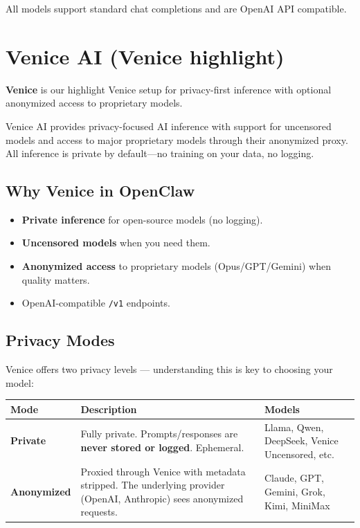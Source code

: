 All models support standard chat completions and are OpenAI API compatible.


\clearpage

\section{Venice AI (Venice highlight)}


\textbf{Venice} is our highlight Venice setup for privacy-first inference with optional anonymized access to proprietary models.

Venice AI provides privacy-focused AI inference with support for uncensored models and access to major proprietary models through their anonymized proxy. All inference is private by default—no training on your data, no logging.

\subsection{Why Venice in OpenClaw}


\begin{itemize}
  \item \textbf{Private inference} for open-source models (no logging).
  \item \textbf{Uncensored models} when you need them.
  \item \textbf{Anonymized access} to proprietary models (Opus/GPT/Gemini) when quality matters.
  \item OpenAI-compatible \texttt{/v1} endpoints.
\end{itemize}


\subsection{Privacy Modes}


Venice offers two privacy levels — understanding this is key to choosing your model:


\begin{table}[h]
\centering
\small
\begin{tabular}{|l|l|l|}
\hline
Mode & Description & Models \\
\hline
\textbf{Private} & Fully private. Prompts/responses are \textbf{never stored or logged}. Ephemeral. & Llama, Qwen, DeepSeek, Venice Uncensored, etc. \\
\hline
\textbf{Anonymized} & Proxied through Venice with metadata stripped. The underlying provider (OpenAI, Anthropic) sees anonymized requests. & Claude, GPT, Gemini, Grok, Kimi, MiniMax \\
\hline
\end{tabular}
\end{table}




